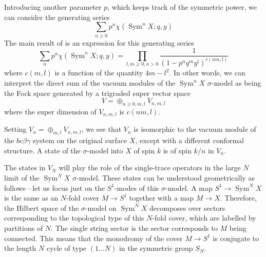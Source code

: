 \documentclass[11pt]{amsart}
\DeclareMathOperator{\Sym}{Sym} \DeclareMathOperator{\Hom}{Hom}
\theoremstyle{thm}
\numberwithin{equation}{subsection}
\theoremstyle{def}
\theoremstyle{rem}
\begin{document}
Introducing another parameter $p$, which keeps track of the symmetric power, we can consider the generating series
\begin{equation} 
	\sum_{n \geq 0} p^n \chi(\Sym^n X; q,y) 
\end{equation}
The main result of \cite{deBoer,Verlinde?} is an expression for this generating series
\begin{equation} 
	\sum_{n} p^n \chi(\Sym^n X; q,y) = \prod_{l,m \geq 0,n >0 } \frac{1}{(1 - p^n q^m y^l)^{c(nm,l)}}
\end{equation}
where $c(m,l)$ is a function of the quantity $4m-l^2$.
In other words, we can interpret the direct sum of the vacuum modules of the $\Sym^n X$ $\sigma$-model as being the Fock space generated by a trigraded super vector space 
\begin{equation} 
	V =\oplus_{n \ge 0,m,l} V_{n,m,l} 
\end{equation}
where the super dimension of $V_{n,m,l}$ is $c(nm,l)$.

Setting $V_n = \oplus_{m,l} V_{n,m,l}$, we see that $V_n$ is isomorphic to the vacuum module of the $bc\beta\gamma$ system on the original surface $X$, except with a different conformal structure.  
A state of the $\sigma$-model into $X$ of spin $k$ is of spin $k/n$ in $V_n$.  

The states in $V_N$ will play the role of the single-trace operators in the large $N$ limit of the $\Sym^N X$ $\sigma$-model.   
These states can be understood geometrically as follows---let us focus just on the $S^1$-modes of this $\sigma$-model.
A map $S^1 \to \Sym^N X$ is the same as an $N$-fold cover $M \to S^1$ together with a map $M \to X$.  
Therefore, the Hilbert space of the $\sigma$-model on $\Sym^N X$ decomposes over sectors corresponding to the topological type of this $N$-fold cover, which are labelled by partitions of $N$. 
The single string sector is the sector corresponds to $M$ being connected. 
This means that the monodromy of the cover $M \to  S^1$ is conjugate to the length $N$ cycle of type $(1 \dots N)$ in the symmetric group $S_N$.  
\end{document}
